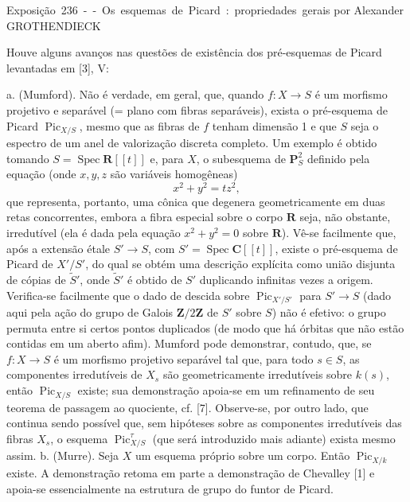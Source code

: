 \unit{Exposição 236 -- Os esquemas de Picard: propriedades gerais}
%
  {por Alexander GROTHENDIECK}


Houve alguns avanços nas questões de existência dos pré-esquemas de Picard
levantadas em [3], V:

\medskip
\noindent a. (Mumford). Não é verdade, em geral, que, quando
$f:X\longrightarrow S$ é um morfismo projetivo e separável (= plano com fibras
separáveis), exista o pré-esquema de Picard $\operatorname{Pic}_{X/S}$, mesmo
que as fibras de $f$ tenham dimensão 1 e que $S$ seja o espectro de um anel de
valorização discreta completo. Um exemplo é obtido tomando
$S=\operatorname{Spec}\mathbf R[[t]]$ e, para $X$, o subesquema de
$\mathbf P^2_S$ definido pela equação (onde $x,y,z$ são variáveis homogêneas)
\[
x^2+y^2=tz^2,
\]
que representa, portanto, uma cônica que degenera geometricamente em duas
retas concorrentes, embora a fibra especial sobre o corpo $\mathbf R$ seja,
não obstante, irredutível (ela é dada pela equação $x^2+y^2=0$ sobre
$\mathbf R$). Vê-se facilmente que, após a extensão étale
$S'\longrightarrow S$, com $S'=\operatorname{Spec}\mathbf C[[t]]$, existe o
pré-esquema de Picard de $X'/S'$, do qual se obtém uma descrição explícita como
união disjunta de cópias de $\widetilde S'$, onde $\widetilde S'$ é obtido de
$S'$ duplicando infinitas vezes a origem. Verifica-se facilmente que o dado de
descida sobre $\operatorname{Pic}_{X'/S'}$ para $S'\longrightarrow S$ (dado
aqui pela ação do grupo de Galois $\mathbf Z/2\mathbf Z$ de $S'$ sobre $S$)
não é efetivo: o grupo permuta entre si certos pontos duplicados (de modo que
há órbitas que não estão contidas em um aberto afim). Mumford pode demonstrar,
contudo, que, se $f:X\longrightarrow S$ é um morfismo projetivo separável tal
que, para todo $s\in S$, as componentes irredutíveis de $X_s$ são
geometricamente irredutíveis sobre $k(s)$, então
$\operatorname{Pic}_{X/S}$ existe; sua demonstração apoia-se em um refinamento
de seu teorema de passagem ao quociente, cf. [7]. Observe-se, por outro lado,
que continua sendo possível que, sem hipóteses sobre as componentes
irredutíveis das fibras $X_s$, o esquema $\operatorname{Pic}^{\tau}_{X/S}$
(que será introduzido mais adiante) exista mesmo assim.
\noindent b. (Murre). Seja $X$ um esquema próprio sobre um corpo. Então
$\operatorname{Pic}_{X/k}$ existe. A demonstração retoma em parte a
demonstração de Chevalley [1] e apoia-se essencialmente na estrutura de grupo
do funtor de Picard.

